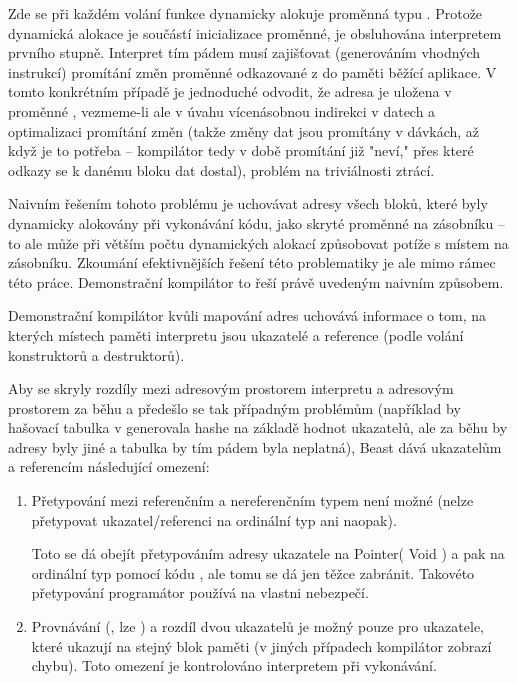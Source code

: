 Zde se při každém volání funkce  dynamicky alokuje proměnná typu . Protože dynamická alokace je součástí inicializace \ctime proměnné, je obsluhována interpretem prvního stupně. Interpret tím pádem musí zajišťovat (generováním vhodných instrukcí) promítání změn proměnné odkazované z  do paměti běžící aplikace. V tomto konkrétním případě je jednoduché odvodit, že adresa je uložena v proměnné , vezmeme-li ale v úvahu vícenásobnou indirekci v \ctime datech a optimalizaci promítání změn (takže změny dat jsou promítány v dávkách, až když je to potřeba -- kompilátor tedy v době promítání již "neví," přes které odkazy se k danému bloku dat dostal), problém na triviálnosti ztrácí.

Naivním řešením tohoto problému je uchovávat adresy všech bloků, které byly dynamicky alokovány při vykonávání \ctime kódu, jako skryté proměnné na zásobníku -- to ale může při větším počtu dynamických alokací způsobovat potíže s místem na zásobníku. Zkoumání efektivnějších řešení této problematiky je ale mimo rámec této práce. Demonstrační kompilátor to řeší právě uvedeným naivním způsobem.

Demonstrační kompilátor kvůli mapování adres uchovává informace o tom, na kterých místech paměti interpretu jsou ukazatelé a reference (podle volání konstruktorů a destruktorů). 

Aby se skryly rozdíly mezi adresovým prostorem interpretu a adresovým prostorem za běhu a předešlo se tak případným problémům (například by hašovací tabulka v \ctime generovala hashe na základě hodnot ukazatelů, ale za běhu by adresy byly jiné a tabulka by tím pádem byla neplatná), Beast dává \ctime ukazatelům a referencím následující omezení:
\begin{enumerate}
	\item Přetypování mezi referenčním a nereferenčním typem není možné (nelze přetypovat ukazatel/referenci na ordinální typ ani naopak).
	
	Toto se dá obejít přetypováním adresy ukazatele na Pointer( Void ) a pak na ordinální typ pomocí kódu , ale tomu se dá jen těžce zabránit. Takovéto přetypování programátor používá na vlastni nebezpečí.
	
	\item Provnávání (\inlineCode{< > <= >=}, lze ) a rozdíl dvou ukazatelů je možný pouze pro ukazatele, které ukazují na stejný blok paměti (v jiných případech kompilátor zobrazí chybu). Toto omezení je kontrolováno interpretem při vykonávání.
\end{enumerate}

